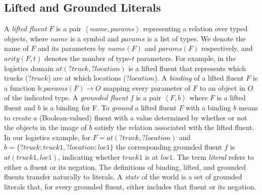 \documentclass{article}
\newcommand{\tuple}[1]{\ensuremath{\left \langle #1 \right \rangle }}
\newcommand{\params}{\textit{params}}
\newcommand{\name}{\textit{name}}
\newcommand{\liftf}{F}
\begin{document}
\subsection{Lifted and Grounded Literals}
A \emph{lifted fluent} $\liftf$ is a pair $\tuple{\name, \params}$ representing a relation over typed objects, where  $\name$ is a symbol and $\params$ is a list of types. 
We denote the name of $\liftf$ and its parameters by $\name(\liftf)$ and $\params(\liftf)$ respectively, and $arity(\liftf,t)$ denotes the number of type-$t$ parameters. 
For example, in the logistics domain $at(?truck, ?location)$ is a lifted fluent that represents which trucks ($?truck$) are at which locations ($?location$). 
A \emph{binding} of a lifted fluent $\liftf$ is a function $b: \params(\liftf)\rightarrow O$ 
mapping every parameter of $\liftf$ to an object in $O$ of the indicated type. 
A \emph{grounded fluent} $f$ is a pair $\tuple{\liftf, b}$ where $\liftf$ is a lifted fluent 
and $b$ is a binding for \liftf. 
To \emph{ground} a lifted fluent $\liftf$ with a binding $b$ means to 
create a (Boolean-valued) fluent with a value determined by whether or not the objects in the image of $b$ satisfy the relation associated with the lifted fluent. 
In our logistics example, for $\liftf=at(?truck, ?location)$ and $b=\{?truck: truck1, ?location: loc1\}$ 
the corresponding grounded fluent $f$ is $at(truck1, loc1)$, indicating whether $truck1$ is at $loc1$.
The term \emph{literal} refers to either a fluent or its negation. 
The definitions of binding, lifted, and grounded fluents transfer naturally to literals. 
A \emph{state} of the world is a set of grounded literals that, for every grounded fluent, either includes that fluent or its negation. 


\end{document}
